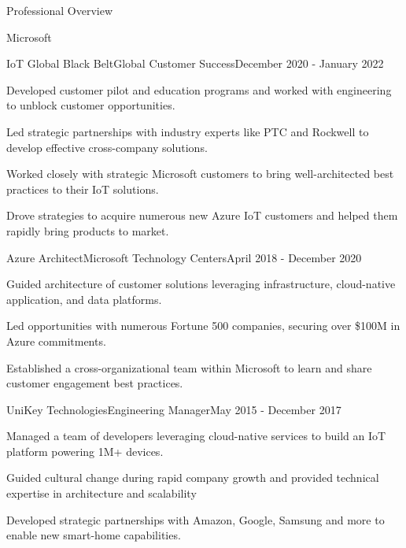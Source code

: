 \documentclass{resume} %
\begin{document}
\begin{rSection}{Professional Overview}
\begin{rCompany}{Microsoft}{}{}
\begin{rSubSubsection}{IoT Global Black Belt}{Global Customer Success}{December 2020 - January 2022}
      \item Developed customer pilot and education programs and worked with engineering to unblock customer opportunities.
      \item Led strategic partnerships with industry experts like PTC and Rockwell to develop effective cross-company solutions.
      \item Worked closely with strategic Microsoft customers to bring well-architected best practices to their IoT solutions.
      \item Drove strategies to acquire numerous new Azure IoT customers and helped them rapidly bring products to market.
      
    \end{rSubSubsection}

    \begin{rSubSubsection}{Azure Architect}{Microsoft Technology Centers}{April 2018 - December 2020}
        
      \item Guided architecture of customer solutions leveraging infrastructure, cloud-native application, and data platforms.
      \item Led opportunities with numerous Fortune 500 companies, securing over \$100M in Azure commitments.
      \item Established a cross-organizational team within Microsoft to learn and share customer engagement best practices.
      
    \end{rSubSubsection}

  \end{rCompany}
  
  
  \begin{rNewRole}{UniKey Technologies}{Engineering Manager}{May 2015 - December 2017}
    
    \item Managed a team of developers leveraging cloud-native services to build an IoT platform powering 1M+ devices.
    \item Guided cultural change during rapid company growth and provided technical expertise in architecture and scalability
    \item Developed strategic partnerships with Amazon, Google, Samsung and more to enable new smart-home capabilities.
    
  \end{rNewRole}
  
  

\end{rSection}
\end{document}
